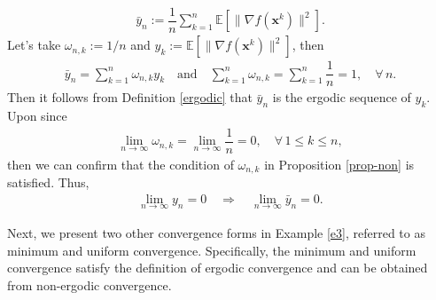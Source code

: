 \documentclass[twoside,11pt]{article}
\begin{document}
\begin{example}
\begin{enumerate}
\begin{align*}
	\bar{y}_{n}
	:=\dfrac{1}{n}
	\sum_{k=1}^{n}
	\mathbb{E}[\lVert\nabla f(\mathbf{x}^{k})\rVert^{2}].
\end{align*}
Let's take $\omega_{n,k}:=1/n$ and $y_{k}:=\mathbb{E}[\lVert\nabla f(\mathbf{x}^{k})\rVert^{2}]$, then
\begin{align*}
	\bar{y}_{n}
	=\sum_{k=1}^{n}\omega_{n,k}
	y_{k}\quad 
	\text{and}\quad 
	\sum_{k=1}^{n}
	\omega_{n,k}
	=\sum_{k=1}^{n}\dfrac{1}{n}
	=1,\quad \forall\,n.
\end{align*}
Then it follows from Definition \ref{ergodic} that $\bar{y}_{n}$ is the ergodic sequence of $y_{k}$. Upon since 
\begin{align*}
	\lim_{n\to\infty}\omega_{n,k}
	=\lim_{n\to\infty}
	\dfrac{1}{n}=0,\quad \forall\,1\leq k\leq n,
\end{align*}
then we can confirm that the condition of $\omega_{n,k}$ in Proposition \ref{prop-non} is satisfied. Thus, 
\begin{align*}
	\lim_{n\to\infty}
	y_{n}=0
	\quad \Longrightarrow\quad 
	\lim_{n\to\infty}
	\bar{y}_{n}=0.
\end{align*}
\end{enumerate}
\end{example}
\par Next, we present two other convergence forms in Example \ref{e3}, referred to as minimum and uniform convergence. Specifically, the minimum and uniform convergence satisfy the definition of ergodic convergence and can be obtained from non-ergodic convergence.
\end{document}
